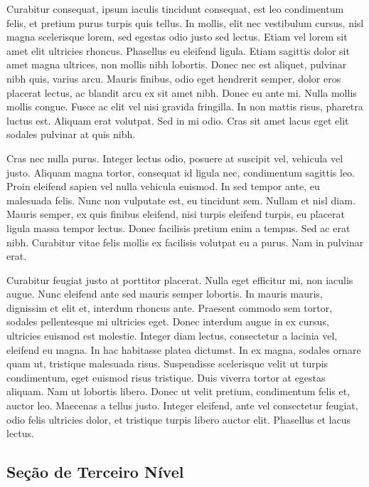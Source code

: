 		Curabitur consequat, ipsum iaculis tincidunt consequat, est leo condimentum felis, et pretium purus turpis quis tellus. In mollis, elit nec vestibulum cursus, nisl magna scelerisque lorem, sed egestas odio justo sed lectus. Etiam vel lorem sit amet elit ultricies rhoncus. Phasellus eu eleifend ligula. Etiam sagittis dolor sit amet magna ultrices, non mollis nibh lobortis. Donec nec est aliquet, pulvinar nibh quis, varius arcu. Mauris finibus, odio eget hendrerit semper, dolor eros placerat lectus, ac blandit arcu ex sit amet nibh. Donec eu ante mi. Nulla mollis mollis congue. Fusce ac elit vel nisi gravida fringilla. In non mattis risus, pharetra luctus est. Aliquam erat volutpat. Sed in mi odio. Cras sit amet lacus eget elit sodales pulvinar at quis nibh.

		Cras nec nulla purus. Integer lectus odio, posuere at suscipit vel, vehicula vel justo. Aliquam magna tortor, consequat id ligula nec, condimentum sagittis leo. Proin eleifend sapien vel nulla vehicula euismod. In sed tempor ante, eu malesuada felis. Nunc non vulputate est, eu tincidunt sem. Nullam et nisl diam. Mauris semper, ex quis finibus eleifend, nisi turpis eleifend turpis, eu placerat ligula massa tempor lectus. Donec facilisis pretium enim a tempus. Sed ac erat nibh. Curabitur vitae felis mollis ex facilisis volutpat eu a purus. Nam in pulvinar erat.

		Curabitur feugiat justo at porttitor placerat. Nulla eget efficitur mi, non iaculis augue. Nunc eleifend ante sed mauris semper lobortis. In mauris mauris, dignissim et elit et, interdum rhoncus ante. Praesent commodo sem tortor, sodales pellentesque mi ultricies eget. Donec interdum augue in ex cursus, ultricies euismod est molestie. Integer diam lectus, consectetur a lacinia vel, eleifend eu magna. In hac habitasse platea dictumst. In ex magna, sodales ornare quam ut, tristique malesuada risus. Suspendisse scelerisque velit ut turpis condimentum, eget euismod risus tristique. Duis viverra tortor at egestas aliquam. Nam ut lobortis libero. Donec ut velit pretium, condimentum felis et, auctor leo. Maecenas a tellus justo. Integer eleifend, ante vel consectetur feugiat, odio felis ultricies dolor, et tristique turpis libero auctor elit. Phasellus et lacus lectus.
		
		\subsection{\esp Seção de Terceiro Nível}\label{section:1.1.1}
		
